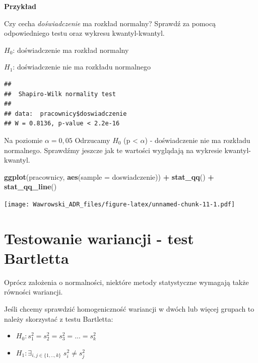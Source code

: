 \documentclass[]{book}
\newenvironment{Shaded}{\begin{snugshade}}{\end{snugshade}}
\newcommand{\DataTypeTok}[1]{\textcolor[rgb]{0.13,0.29,0.53}{#1}}
\newcommand{\KeywordTok}[1]{\textcolor[rgb]{0.13,0.29,0.53}{\textbf{#1}}}
\newcommand{\NormalTok}[1]{#1}
\newcommand{\OperatorTok}[1]{\textcolor[rgb]{0.81,0.36,0.00}{\textbf{#1}}}
\newcommand{\StringTok}[1]{\textcolor[rgb]{0.31,0.60,0.02}{#1}}
\providecommand{\tightlist}{%
  \setlength{\itemsep}{0pt}\setlength{\parskip}{0pt}}
\begin{document}
\textbf{Przykład}

Czy cecha \emph{doświadczenie} ma rozkład normalny? Sprawdź za pomocą odpowiedniego testu oraz wykresu kwantyl-kwantyl.

\(H_0\): doświadczenie ma rozkład normalny

\(H_1\): doświadczenie nie ma rozkładu normalnego

\begin{Shaded}
\end{Shaded}

\begin{verbatim}
## 
##  Shapiro-Wilk normality test
## 
## data:  pracownicy$doswiadczenie
## W = 0.8136, p-value < 2.2e-16
\end{verbatim}

Na poziomie \(\alpha = 0,05\) Odrzucamy \(H_0\) (p \textless{} \(\alpha\)) - doświadczenie nie ma rozkładu normalnego. Sprawdźmy jeszcze jak te wartości wyglądają na wykresie kwantyl-kwantyl.

\begin{Shaded}
\begin{Highlighting}[]
\KeywordTok{ggplot}\NormalTok{(pracownicy, }\KeywordTok{aes}\NormalTok{(}\DataTypeTok{sample =}\NormalTok{ doswiadczenie)) }\OperatorTok{+}
\StringTok{  }\KeywordTok{stat_qq}\NormalTok{() }\OperatorTok{+}
\StringTok{  }\KeywordTok{stat_qq_line}\NormalTok{()}
\end{Highlighting}
\end{Shaded}

\texttt{[image: Wawrowski\_ADR\_files/figure-latex/unnamed-chunk-11-1.pdf]}

\hypertarget{testowanie-wariancji---test-bartletta}{%
\section{Testowanie wariancji - test Bartletta}\label{testowanie-wariancji---test-bartletta}}

Oprócz założenia o normalności, niektóre metody statystyczne wymagają także równości wariancji.

Jeśli chcemy sprawdzić homogeniczność wariancji w dwóch lub więcej grupach to należy skorzystać z testu Bartletta:

\begin{itemize}
\tightlist
\item
  \(H_0: s^2_1=s^2_2= s^2_3 =...=s^2_k\)
\item
  \(H_1: \exists_{i,j\in\{1,..,k\}} \; s^2_i \neq s^2_j\)
\end{itemize}
\end{document}
